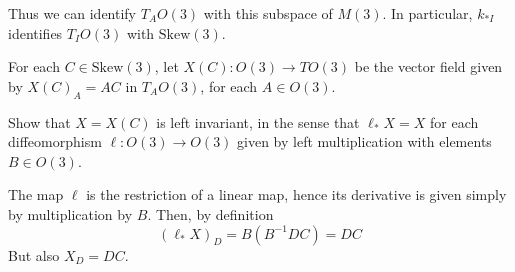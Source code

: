 \documentclass[11pt, english]{article}
\begin{document}
Thus we can identify $T_AO(3)$ with this subspace of $M(3)$. In particular, $k_{\ast I}$ identifies $T_IO(3)$ with $\mathrm{Skew}(3)$. 

For each $C \in \mathrm{Skew}(3)$, let $X(C):O(3) \to TO(3)$ be the vector field given by $X(C)_A=AC$ in $T_AO(3)$, for each $A \in O(3)$.

\begin{exc}
  Show that $X=X(C)$ is left invariant, in the sense that $\ell_\ast X = X$ for each diffeomorphism $\ell:O(3) \to O(3)$ given by left multiplication with elements $B \in O(3)$.
\end{exc}
\begin{sol}
 The map $\ell$ is the restriction of a linear map, hence its derivative is given simply by multiplication by $B$. Then, by definition
\[
(\ell_\ast X)_D = B(B^{-1}DC)=DC
\]
But also $X_D=DC$.
\end{sol}
\end{document}
